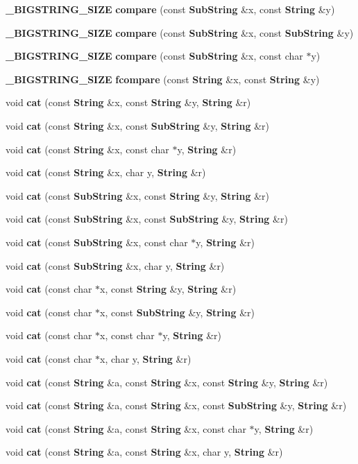 \begin{CompactItemize}
{\bf \_\-BIGSTRING\_\-SIZE} {\bf compare} (const {\bf Sub\-String} \&x, const {\bf String} \&y)
\item 
{\bf \_\-BIGSTRING\_\-SIZE} {\bf compare} (const {\bf Sub\-String} \&x, const {\bf Sub\-String} \&y)
\item 
{\bf \_\-BIGSTRING\_\-SIZE} {\bf compare} (const {\bf Sub\-String} \&x, const char $\ast$y)
\item 
{\bf \_\-BIGSTRING\_\-SIZE} {\bf fcompare} (const {\bf String} \&x, const {\bf String} \&y)
\item 
void {\bf cat} (const {\bf String} \&x, const {\bf String} \&y, {\bf String} \&r)
\item 
void {\bf cat} (const {\bf String} \&x, const {\bf Sub\-String} \&y, {\bf String} \&r)
\item 
void {\bf cat} (const {\bf String} \&x, const char $\ast$y, {\bf String} \&r)
\item 
void {\bf cat} (const {\bf String} \&x, char y, {\bf String} \&r)
\item 
void {\bf cat} (const {\bf Sub\-String} \&x, const {\bf String} \&y, {\bf String} \&r)
\item 
void {\bf cat} (const {\bf Sub\-String} \&x, const {\bf Sub\-String} \&y, {\bf String} \&r)
\item 
void {\bf cat} (const {\bf Sub\-String} \&x, const char $\ast$y, {\bf String} \&r)
\item 
void {\bf cat} (const {\bf Sub\-String} \&x, char y, {\bf String} \&r)
\item 
void {\bf cat} (const char $\ast$x, const {\bf String} \&y, {\bf String} \&r)
\item 
void {\bf cat} (const char $\ast$x, const {\bf Sub\-String} \&y, {\bf String} \&r)
\item 
void {\bf cat} (const char $\ast$x, const char $\ast$y, {\bf String} \&r)
\item 
void {\bf cat} (const char $\ast$x, char y, {\bf String} \&r)
\item 
void {\bf cat} (const {\bf String} \&a, const {\bf String} \&x, const {\bf String} \&y, {\bf String} \&r)
\item 
void {\bf cat} (const {\bf String} \&a, const {\bf String} \&x, const {\bf Sub\-String} \&y, {\bf String} \&r)
\item 
void {\bf cat} (const {\bf String} \&a, const {\bf String} \&x, const char $\ast$y, {\bf String} \&r)
\item 
void {\bf cat} (const {\bf String} \&a, const {\bf String} \&x, char y, {\bf String} \&r)

\end{CompactItemize}
